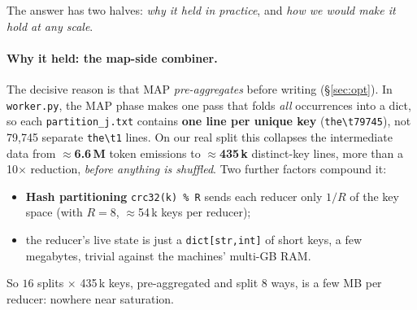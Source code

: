 \documentclass[11pt,a4paper]{article}
\newcommand{\code}[1]{\texttt{\small #1}}
\begin{document}
\medskip\noindent The answer has two halves: \emph{why it held in
practice}, and \emph{how we would make it hold at any scale}.

\paragraph{Why it held: the map-side combiner.} The decisive reason is that MAP
\emph{pre-aggregates} before writing (\S\ref{sec:opt}). In
\code{worker.py}, the MAP phase makes one pass that folds \emph{all} occurrences
into a dict, so each \code{partition\_j.txt} contains \textbf{one line per unique
key} (\code{the\textbackslash t79745}), not 79{,}745 separate
\code{the\textbackslash t1} lines. On our real split this collapses the
intermediate data from $\approx$\textbf{6.6\,M} token emissions to
$\approx$\textbf{435\,k} distinct-key lines, more than a 10$\times$ reduction,
\emph{before anything is shuffled}. Two further factors compound it:
\begin{itemize}[leftmargin=1.4em]
  \item \textbf{Hash partitioning} \code{crc32(k)\,\%\,R} sends each reducer only
  $1/R$ of the key space (with $R=8$, $\approx$54\,k keys per reducer);
  \item the reducer's live state is just a \code{dict[str,int]} of short keys,
  a few megabytes, trivial against the machines' multi-GB RAM.
\end{itemize}
So $16$ splits $\times$ 435\,k keys, pre-aggregated and split $8$ ways, is a few
MB per reducer: nowhere near saturation.
\end{document}
